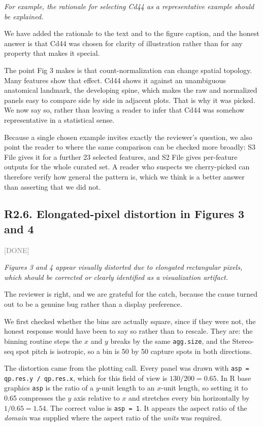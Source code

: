 \documentclass[11pt]{article}
\newcommand{\status}[1]{\textcolor{gray}{\small\textsf{[#1]}}}
\newenvironment{rev}{\begin{leftbar}\itshape\small}{\end{leftbar}}
\begin{document}
\begin{rev}
For example, the rationale for selecting Cd44 as a representative example should be
explained.
\end{rev}

\noindent We have added the rationale to the text and to the figure caption, and the honest
answer is that Cd44 was chosen for clarity of illustration rather than for any property that
makes it special.

The point Fig 3 makes is that count-normalization can change spatial topology. Many features
show that effect. Cd44 shows it against an unambiguous anatomical landmark, the developing
spine, which makes the raw and normalized panels easy to compare side by side in adjacent
plots. That is why it was picked. We now say so, rather than leaving a reader to infer that
Cd44 was somehow representative in a statistical sense.

Because a single chosen example invites exactly the reviewer's question, we also point the
reader to where the same comparison can be checked more broadly: S3 File gives it for a
further 23 selected features, and S2 File gives per-feature outputs for the whole curated set.
A reader who suspects we cherry-picked can therefore verify how general the pattern is, which
we think is a better answer than asserting that we did not.

\subsection{R2.6. Elongated-pixel distortion in Figures 3 and 4} \status{DONE}

\begin{rev}
Figures 3 and 4 appear visually distorted due to elongated rectangular pixels, which
should be corrected or clearly identified as a visualization artifact.
\end{rev}

\noindent The reviewer is right, and we are grateful for the catch, because the cause turned
out to be a genuine bug rather than a display preference.

We first checked whether the bins are actually square, since if they were not, the honest
response would have been to say so rather than to rescale. They are: the binning routine steps
the $x$ and $y$ breaks by the same \texttt{agg.size}, and the Stereo-seq spot pitch is
isotropic, so a bin is 50 by 50 capture spots in both directions.

The distortion came from the plotting call. Every panel was drawn with
\texttt{asp = qp.res.y / qp.res.x}, which for this field of view is $130/200 = 0.65$. In R
base graphics \texttt{asp} is the ratio of a $y$-unit length to an $x$-unit length, so
setting it to 0.65 compresses the $y$ axis relative to $x$ and stretches every bin
horizontally by $1/0.65 = 1.54$. The correct value is \texttt{asp = 1}. It appears the
aspect ratio of the \emph{domain} was supplied where the aspect ratio of the \emph{units} was
required.
\end{document}
